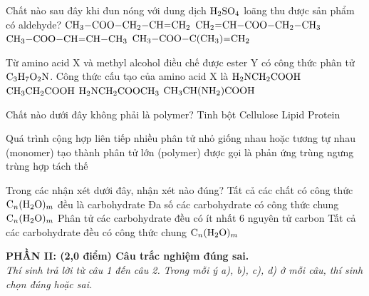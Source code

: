 \documentclass[11pt,a4paper]{article}
\begin{document}
\begin{ex}
Chất nào sau đây khi đun nóng với dung dịch $\ce{H2SO4}$ loãng thu được sản phẩm có aldehyde?
\choice
{$\ce{CH3-COO-CH2-CH=CH2}$}
{$\ce{CH2=CH-COO-CH2-CH3}$}
{\True $\ce{CH3-COO-CH=CH-CH3}$}
{$\ce{CH3-COO-C(CH3)=CH2}$}
\end{ex}
\begin{ex}
Từ amino acid X và methyl alcohol điều chế được ester Y có công thức phân tử $\ce{C3H7O2N}$. Công thức cấu tạo của amino acid X là
\choice
{\True $\ce{H2NCH2COOH}$}
{$\ce{CH3CH2COOH}$}
{$\ce{H2NCH2COOCH3}$}
{$\ce{CH3CH(NH2)COOH}$}
\end{ex}
\begin{ex}
Chất nào dưới đây không phải là polymer?
\choice
{Tinh bột}
{Cellulose}
{\True Lipid}
{Protein}
\end{ex}
\begin{ex}
Quá trình cộng hợp liên tiếp nhiều phân tử nhỏ giống nhau hoặc tương tự nhau (monomer) tạo thành phân tử lớn (polymer) được gọi là phản ứng
\choice
{trùng ngưng}
{\True trùng hợp}
{tách}
{thế}
\end{ex}
\begin{ex}
Trong các nhận xét dưới đây, nhận xét nào đúng?
\choice
{Tất cả các chất có công thức $\ce{C_n(H2O)_m}$ đều là carbohydrate}
{\True Đa số các carbohydrate có công thức chung $\ce{C_n(H2O)_m}$}
{Phân tử các carbohydrate đều có ít nhất 6 nguyên tử carbon}
{Tất cả các carbohydrate đều có công thức chung $\ce{C_n(H2O)_m}$}
\end{ex}
\vspace{4pt}
\noindent
{\color{mainGreen}\textbf{\large PHẦN II: (2,0 điểm) Câu trắc nghiệm đúng sai.}}\\
\textit{\small Thí sinh trả lời từ câu 1 đến câu 2. Trong mỗi ý a), b), c), d) ở mỗi câu, thí sinh chọn đúng hoặc sai.}
\vspace{2pt}
\end{document}
